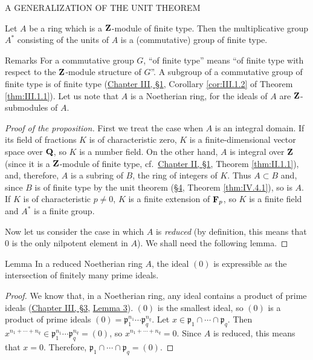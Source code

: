 %
        {A GENERALIZATION OF THE UNIT THEOREM}

\begin{proposition}
\label{prop:IV.7.1}
Let $A$ be a ring which is a $\mathbf{Z}$-module of finite type. Then the
multiplicative group $A^{*}$ consisting of the units of $A$ is a
(commutative) group of finite type.
\end{proposition}

\begin{statement}{Remarks}
\upshape
For a commutative group $G$, ``of finite type'' means ``of finite type with
respect to the $\mathbf{Z}$-module structure of $G$''. A subgroup of a commutative
group of finite type is of finite type (\hyperref[sec:3.1]{Chapter III, §1}, Corollary
\ref{cor:III.1.2} of Theorem \ref{thm:III.1.1}). Let us note that $A$ is a
Noetherian ring, for the ideals of $A$ are $\mathbf{Z}$-submodules of $A$.
\end{statement}

\begin{proof}[Proof of the proposition]
First we treat the case when $A$ is an integral domain. If its field of
fractions $K$ is of characteristic zero, $K$ is a finite-dimensional vector
space over $\mathbf{Q}$, so $K$ is a number field. On the other hand, $A$ is integral
over $\mathbf{Z}$ (since it is a $\mathbf{Z}$-module of finite type, cf.\ \hyperref[sec:2.1]{Chapter II, §1},
Theorem \ref{thm:II.1.1}), and, therefore, $A$ is a subring of $B$, the ring
of integers of $K$. Thus $A\subset B$ and, since $B$ is of finite type by the
unit theorem (\hyperref[sec:4.4]{§4}, Theorem \ref{thm:IV.4.1}), so is $A$. If $K$ is of
characteristic $p\neq0$, $K$ is a finite extension of $\mathbf{F}_{p}$, so $K$ is a
finite field and $A^{*}$ is a finite group.

Now let us consider the case in which $A$ is \emph{reduced} (by definition,
this means that $0$ is the only nilpotent element in $A$). We shall need the
following lemma.
\end{proof}

\begin{statement}{Lemma}
In a reduced Noetherian ring $A$, the ideal $(0)$ is expressible as the
intersection of finitely many prime ideals.
\end{statement}

\begin{proof}
We know that, in a Noetherian ring, any ideal contains a product of prime
ideals (\hyperref[sec:3.3]{Chapter III, §3}, \hyperref[lem:III.3.3]{Lemma 3}). $(0)$ is the smallest ideal, so $(0)$ is a
product of prime ideals
$(0)=\mathfrak{p}_{1}^{n_{1}}\cdots\mathfrak{p}_{q}^{n_{q}}$. Let
$x\in\mathfrak{p}_{1}\cap\cdots\cap\mathfrak{p}_{q}$. Then
$x^{n_{1}+\cdots+n_{q}}\in
\mathfrak{p}_{1}^{n_{1}}\cdots\mathfrak{p}_{q}^{n_{q}}=(0)$, so
$x^{n_{1}+\cdots+n_{q}}=0$. Since $A$ is reduced, this means that $x=0$.
Therefore, $\mathfrak{p}_{1}\cap\cdots\cap\mathfrak{p}_{q}=(0)$.
\end{proof}

